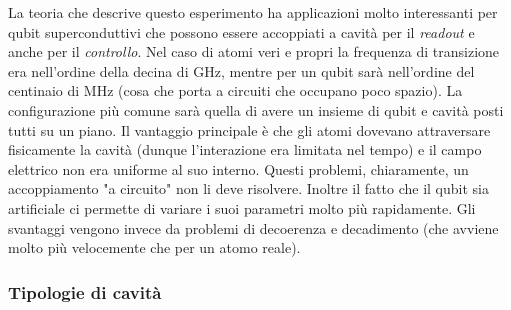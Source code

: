 \vspace{0.5cm}
\newline
\noindent{}
\vspace{0.5cm}
\noindent La teoria che descrive questo esperimento ha applicazioni molto interessanti per qubit superconduttivi che possono essere accoppiati a cavità per il \textit{readout} e anche per il \textit{controllo}.
Nel caso di atomi veri e propri la frequenza di transizione era nell'ordine della decina di GHz, mentre per un qubit sarà nell'ordine del centinaio di MHz (cosa che porta a circuiti che occupano poco spazio). La configurazione più comune sarà quella di avere un insieme di qubit e cavità posti tutti su un piano. Il vantaggio principale è che gli atomi dovevano attraversare fisicamente la cavità (dunque l'interazione era limitata nel tempo) e il campo elettrico non era uniforme al suo interno. Questi problemi, chiaramente, un accoppiamento "a circuito" non li deve risolvere. Inoltre il fatto che il qubit sia artificiale ci permette di variare i suoi parametri molto più rapidamente. Gli svantaggi vengono invece da problemi di decoerenza e decadimento (che avviene molto più velocemente che per un atomo reale).

\subsubsection{Tipologie di cavità}

